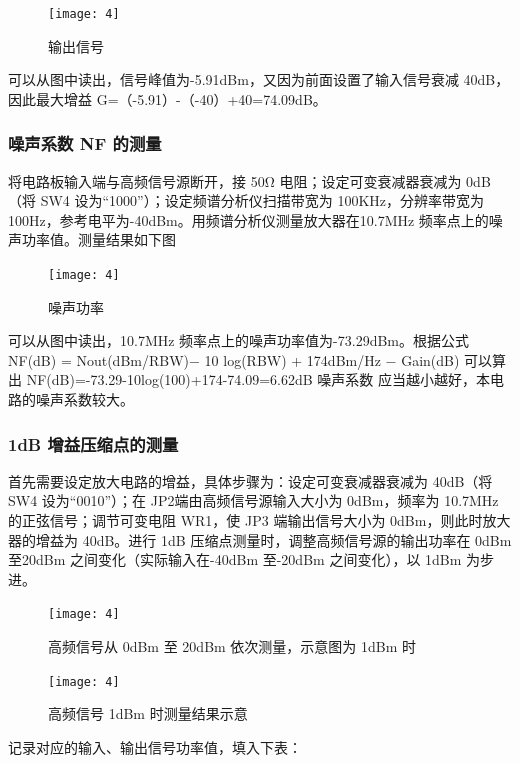 \documentclass{../source/Experiment}
\begin{document}
\begin{figure}[H]
    \centering
    \texttt{[image: 4]}
    \caption{输出信号}
\end{figure}

可以从图中读出，信号峰值为-5.91dBm，又因为前面设置了输入信号衰减 40dB，因此最大增益 G=（-5.91）-（-40）+40=74.09dB。



\subsubsection{噪声系数 NF 的测量}

将电路板输入端与高频信号源断开，接 50Ω 电阻；设定可变衰减器衰减为 0dB（将 SW4 设为“1000”）；设定频谱分析仪扫描带宽为 100KHz，分辨率带宽为 100Hz，参考电平为-40dBm。用频谱分析仪测量放大器在10.7MHz 频率点上的噪声功率值。测量结果如下图

\begin{figure}[H]
    \centering
    \texttt{[image: 4]}
    \caption{噪声功率}
\end{figure}


可以从图中读出，10.7MHz 频率点上的噪声功率值为-73.29dBm。根据公式 NF(dB) = Nout(dBm/RBW)−
10 log(RBW) + 174dBm/Hz − Gain(dB) 可以算出 NF(dB)=-73.29-10log(100)+174-74.09=6.62dB 噪声系数
应当越小越好，本电路的噪声系数较大。


\subsubsection{1dB 增益压缩点的测量}

首先需要设定放大电路的增益，具体步骤为：设定可变衰减器衰减为 40dB（将 SW4 设为“0010”）；在 JP2端由高频信号源输入大小为 0dBm，频率为 10.7MHz 的正弦信号；调节可变电阻 WR1，使 JP3 端输出信号大小为 0dBm，则此时放大器的增益为 40dB。进行 1dB 压缩点测量时，调整高频信号源的输出功率在 0dBm 至20dBm 之间变化（实际输入在-40dBm 至-20dBm 之间变化），以 1dBm 为步进。

\begin{figure}[H]
    \centering
    \texttt{[image: 4]}
    \caption{高频信号从 0dBm 至 20dBm 依次测量，示意图为 1dBm 时}
\end{figure}

\begin{figure}[H]
    \centering
    \texttt{[image: 4]}
    \caption{高频信号 1dBm 时测量结果示意}
\end{figure}

记录对应的输入、输出信号功率值，填入下表：
\end{document}
